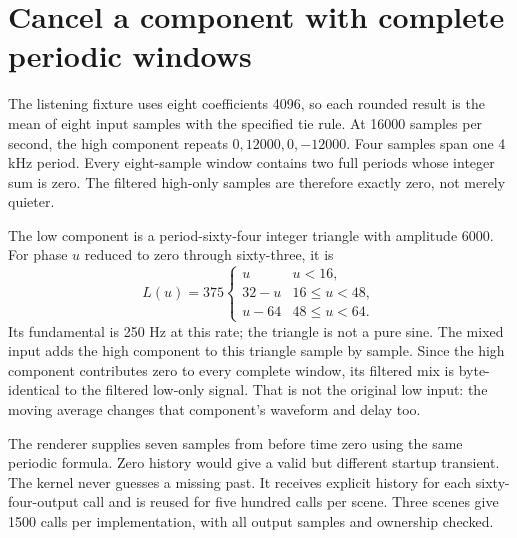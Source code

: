 \section{Cancel a component with complete periodic windows}
The listening fixture uses eight coefficients 4096, so each rounded result is the
mean of eight input samples with the specified tie rule. At 16000 samples per second,
the high component repeats \(0,12000,0,-12000\). Four samples span one 4 kHz period.
Every eight-sample window contains two full periods whose integer sum is zero.
The filtered high-only samples are therefore exactly zero, not merely quieter.

The low component is a period-sixty-four integer triangle with amplitude 6000. For
phase \(u\) reduced to zero through sixty-three, it is
\[
  L(u)=375\begin{cases}
    u    & u<16,        \\
    32-u & 16\leq u<48, \\
    u-64 & 48\leq u<64.
  \end{cases}
\]
Its fundamental is 250 Hz at this rate; the triangle is not a pure sine. The mixed
input adds the high component to this triangle sample by sample. Since the high
component contributes zero to every complete window, its filtered mix is byte-identical
to the filtered low-only signal. That is not the original low input: the moving
average changes that component's waveform and delay too.

The renderer supplies seven samples from before time zero using the same periodic
formula. Zero history would give a valid but different startup transient. The kernel
never guesses a missing past. It receives explicit history for each sixty-four-output
call and is reused for five hundred calls per scene. Three scenes give 1500 calls
per implementation, with all output samples and ownership checked.

